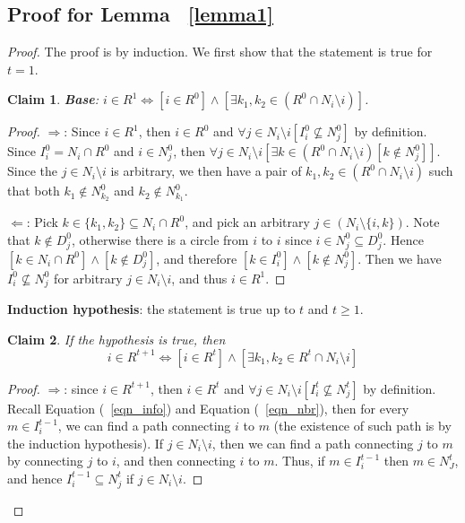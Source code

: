 \documentclass[12pt]{article}
\newtheorem{claim}{Claim}[subsubsection]
\theoremstyle{remark}
\theoremstyle{remark}
\begin{document}
\subsection{Proof for Lemma ~\ref{lemma1}}
\begin{proof}
The proof is by induction. We first show that the statement is true for $t=1$. 

\begin{claim}
\textbf{Base}: $i\in R^1\Leftrightarrow [i\in R^0] \wedge [\exists k_1,k_2\in (R^0\cap N_i\setminus i)]$. 
\end{claim}
\begin{proof}
$\Rightarrow$: Since $i\in R^1$, then $i\in R^0$ and $\forall j\in N_i\setminus i [I^0_i\nsubseteq N^0_j]$ by definition. Since $I^0_i=N_i\cap R^0$ and $i\in N^0_j$, then  $\forall j\in N_i\setminus i [\exists k\in (R^0\cap N_i\setminus i) [k\notin N^0_j]]$. Since the $j\in N_i\setminus i$ is arbitrary,  we then have a pair of $k_1, k_2 \in (R^0\cap N_i\setminus i)$ such that both $k_1\notin N^0_{k_2}$ and $k_2\notin N^0_{k_1}$.

\bigskip

$\Leftarrow$: Pick $k\in \{k_1,k_2\}\subseteq N_i\cap R^0$, and pick an arbitrary $j\in (N_i\setminus \{i,k\})$. Note that $k\notin D^0_j$, otherwise there is a circle from $i$ to $i$ since $i\in N^0_j\subseteq D^0_j$. Hence $[k\in N_i\cap R^0] \wedge [k\notin D^0_j]$, and therefore $[k\in I^0_i] \wedge [k\notin N^0_j]$. Then we have $I^0_i\nsubseteq N^0_j$ for arbitrary $j\in N_i\setminus i$, and thus $i\in R^1$.
\end{proof}

\textbf{Induction hypothesis}: the statement is true up to $t$ and $t\geq 1$. 

\begin{claim}
If the hypothesis is true, then \[i\in R^{t+1}\Leftrightarrow [i\in R^{t}] \wedge [\exists k_1,k_2\in R^{t}\cap N_i\setminus i]\]
\end{claim}
\begin{proof}
$\Rightarrow$: since $i\in R^{t+1}$, then $i\in R^t$ and $\forall j\in N_i\setminus i [I^t_i\nsubseteq N^t_j]$ by definition. Recall Equation (~\ref{eqn_info}) and Equation (~\ref{eqn_nbr}), then for every $m\in I^{t-1}_i$, we can find a path connecting $i$ to $m$ (the existence of such path is by the induction hypothesis). If $j\in N_i\setminus i$, then we can find a path connecting $j$ to $m$ by connecting $j$ to $i$, and then connecting $i$ to $m$. Thus, if $m\in I^{t-1}_i$ then $m\in N^t_J$, and hence $I^{t-1}_i\subseteq N^t_{j}$ if $j\in N_i\setminus i$.


\end{proof}
\end{proof}
\end{document}
